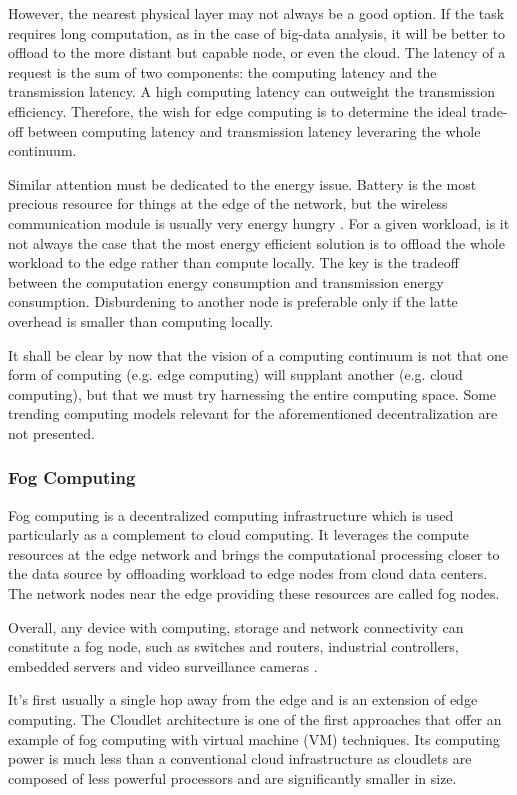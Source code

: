 \documentclass{ieeeaccess}
\begin{document}
However, the nearest physical layer may not always be a good option. If the task requires long computation, as in the case of big-data analysis, it will be better to offload to the more distant but capable node, or even the cloud. The latency of a request is the sum of two components: the computing latency and the transmission latency. A high computing latency can outweight the transmission efficiency. Therefore, the wish for edge computing is to determine the ideal trade-off between computing latency and transmission latency leveraring the whole continuum.

Similar attention must be dedicated to the energy issue. Battery is the most precious resource for things at the edge of the network, but the wireless communication module is usually very energy hungry \cite{edge-computing-vision-challenges}. For a given workload, is it not always the case that the most energy efficient solution is to offload the whole workload to the edge rather than compute locally. The key is the tradeoff between the computation energy consumption and transmission energy consumption. Disburdening to another node is preferable only if the latte overhead is smaller than computing locally.

It shall be clear by now that the vision of a computing continuum is not that one form of computing (e.g. edge computing) will supplant another (e.g. cloud computing), but that we must try harnessing the entire computing space. Some trending computing models relevant for the aforementioned decentralization are not presented.

\subsubsection{Fog Computing}

Fog computing \cite{fog-computing} is a decentralized computing infrastructure which is used particularly as a complement to cloud computing. It leverages the compute resources at the edge network and brings the computational processing closer to the data source by offloading workload to edge nodes from cloud data centers. The network nodes near the edge providing these resources are called fog nodes.

Overall, any device with computing, storage and network connectivity can constitute a fog node, such as switches and routers, industrial controllers, embedded servers and video surveillance cameras \cite{camera-virtualisation}.

It's first usually a single hop away from the edge and is an extension of edge computing. The Cloudlet \cite{cloudlet} architecture is one of the first approaches that offer an example of fog computing with virtual machine (VM) techniques. Its computing power is much less than a conventional cloud infrastructure as cloudlets are composed of less powerful processors and are significantly smaller in size.
\end{document}

